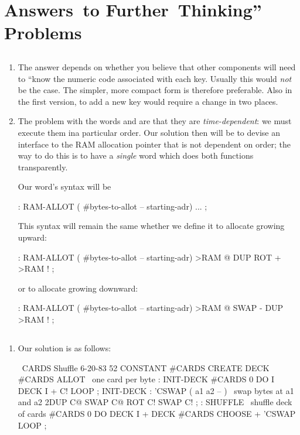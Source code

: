 
\chapter{Answers~to
Further~Thinking''
Problems}
\section{}
\begin{enumerate}
\item The answer depends on whether you believe that other components will
need to ``know the numeric code associated with each key.  Usually this
would \emph{not} be the case.  The simpler, more compact form is therefore
preferable.  Also in the first version, to add a new key would require a 
change in two places.
\item The problem with the words  and  are that they are 
\emph{time-dependent}:  we must execute them ina particular order.  Our solution
then will be to devise an interface to the RAM allocation pointer that is not
dependent on order; the way to do this is to have a \emph{single} word which does
both functions transparently.

Our word's syntax will be
\begin{Code}
: RAM-ALLOT   ( #bytes-to-allot -- starting-adr) 
    ... ;
\end{Code}
This syntax will remain the same whether we define it to allocate growing 
upward:
\begin{Code}
: RAM-ALLOT  ( #bytes-to-allot -- starting-adr)
    >RAM @  DUP ROT +  >RAM ! ;
\end{Code}
or to allocate growing downward:
\begin{Code}
: RAM-ALLOT  ( #bytes-to-allot -- starting-adr)
    >RAM @  SWAP -  DUP >RAM ! ;
\end{Code}
\end{enumerate}

\section{}
\begin{enumerate}
\item Our solution is as follows:
\begin{Code}
\ CARDS               Shuffle                6-20-83
52 CONSTANT #CARDS
CREATE DECK  #CARDS ALLOT   \   one card per byte
: INIT-DECK
   #CARDS 0 DO  I  DECK I + C!  LOOP ;
INIT-DECK
: 'CSWAP  ( a1 a2 -- )  \  swap bytes at a1 and a2
   2DUP C@  SWAP C@  ROT C!  SWAP C! ;
: SHUFFLE   \  shuffle deck of cards
   #CARDS 0 DO  DECK I +  DECK  #CARDS CHOOSE +
      'CSWAP  LOOP ;
\end{Code}
\end{enumerate}
